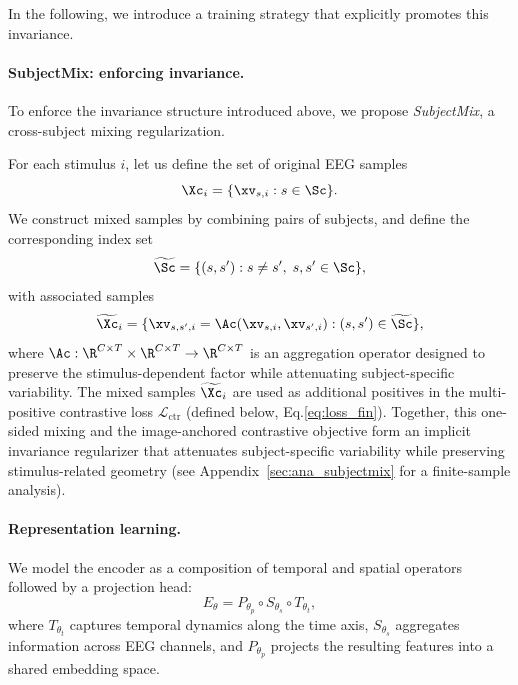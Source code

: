 \documentclass{article}
\begin{document}
In the following, we introduce a training strategy that explicitly promotes this invariance.



 
 


\paragraph{SubjectMix: enforcing invariance.}
To enforce the invariance structure introduced above, we propose \emph{SubjectMix}, a cross-subject mixing regularization. 

For each stimulus $i$, let us define the set of original EEG samples
\begin{equation}
\Xc_i = \{ \xv_{s,i} : s \in \Sc \}.
\end{equation}
We construct mixed samples by combining pairs of subjects, and define the corresponding index set
\begin{equation}
\widetilde{\Sc} = \{ (s,s') : s \neq s',\; s,s' \in \Sc \},
\end{equation}
with associated samples
\begin{equation}
\widetilde{\Xc}_i = \{ \xv_{s,s',i} = \Ac(\xv_{s,i}, \xv_{s',i}) : (s,s') \in \widetilde{\Sc} \},
\end{equation}
where $\Ac: \R^{C \times T} \times \R^{C \times T} \rightarrow \R^{C \times T}$ is an aggregation operator designed to preserve the stimulus-dependent factor while attenuating subject-specific variability. The
mixed samples $\widetilde{\Xc}_i$ are used as additional
positives in the multi-positive contrastive loss $\mathcal{L}_{\mathrm{ctr}}$ (defined below, Eq.\ref{eq:loss_fin}). Together, this one-sided
mixing and the image-anchored contrastive objective form an implicit
invariance regularizer that attenuates subject-specific variability
while preserving stimulus-related geometry (see
Appendix~\ref{sec:ana_subjectmix} for a finite-sample analysis).

\paragraph{Representation learning.}
We model the encoder as a composition of temporal and spatial operators followed by a projection head: 
\begin{equation}\label{eq:enc_decom}
E_\theta = P_{\theta_p} \circ S_{\theta_s} \circ T_{\theta_t},
\end{equation}
where $T_{\theta_t}$ captures temporal dynamics along the time axis, $S_{\theta_s}$ aggregates information across EEG channels, and $P_{\theta_p}$ projects the resulting features into a shared embedding space.
\end{document}
